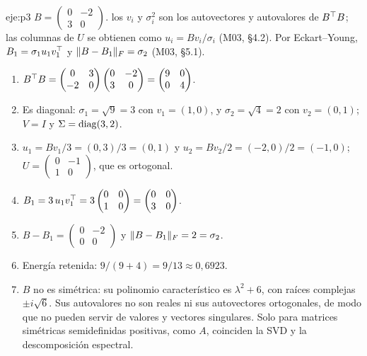 \begin{solucion}{eje:p3}
\datos $B=\begin{pmatrix}0&-2\\3&0\end{pmatrix}$.
\planteamiento los $v_i$ y $\sigma_i^{2}$ son los autovectores y autovalores de $B^{\top} B$; las columnas de $U$ se obtienen como $u_i=Bv_i/\sigma_i$ (M03, §4.2). Por Eckart--Young, $B_1=\sigma_1u_1v_1^{\top}$ y $\lVert B-B_1\rVert_F=\sigma_2$ (M03, §5.1).
\pasos
\begin{enumerate}[label=\arabic*.]
  \item $B^{\top} B=\begin{pmatrix}0&3\\-2&0\end{pmatrix}\begin{pmatrix}0&-2\\3&0\end{pmatrix}=\begin{pmatrix}9&0\\0&4\end{pmatrix}$.
  \item Es diagonal: $\sigma_1=\sqrt9=3$ con $v_1=(1,0)$, y $\sigma_2=\sqrt4=2$ con $v_2=(0,1)$; $V=I$ y $\Sigma=\operatorname{diag}(3,2)$.
  \item $u_1=Bv_1/3=(0,3)/3=(0,1)$ y $u_2=Bv_2/2=(-2,0)/2=(-1,0)$; $U=\begin{pmatrix}0&-1\\1&0\end{pmatrix}$, que es ortogonal.
  \item $B_1=3\,u_1v_1^{\top}=3\begin{pmatrix}0&0\\1&0\end{pmatrix}=\begin{pmatrix}0&0\\3&0\end{pmatrix}$.
  \item $B-B_1=\begin{pmatrix}0&-2\\0&0\end{pmatrix}$ y $\lVert B-B_1\rVert_F=2=\sigma_2$.
  \item Energía retenida: $9/(9+4)=9/13\approx 0{,}6923$.
  \item $B$ no es simétrica: su polinomio característico es $\lambda^{2}+6$, con raíces complejas $\pm i\sqrt6$. Sus autovalores no son reales ni sus autovectores ortogonales, de modo que no pueden servir de valores y vectores singulares. Solo para matrices simétricas semidefinidas positivas, como $A$, coinciden la SVD y la descomposición espectral.

\end{enumerate}
\end{solucion}
